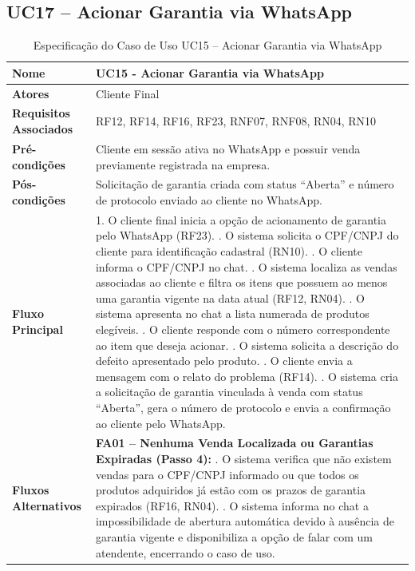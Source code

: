 \subsection{UC17 – Acionar Garantia via WhatsApp}

\begin{table}[H]
	\centering
	\caption{Especificação do Caso de Uso UC15 – Acionar Garantia via WhatsApp}
	\label{tab:uc15}
	\begin{tabular}{|p{3.5cm}|p{11.5cm}|}
		\hline
		\textbf{Nome} & UC15 - Acionar Garantia via WhatsApp \\ \hline
		\textbf{Atores} & Cliente Final \\ \hline
		\textbf{Requisitos Associados} & RF12, RF14, RF16, RF23, RNF07, RNF08, RN04, RN10 \\ \hline
		\textbf{Pré-condições} & Cliente em sessão ativa no WhatsApp e possuir venda previamente registrada na empresa. \\ \hline
		\textbf{Pós-condições} & Solicitação de garantia criada com status ``Aberta'' e número de protocolo enviado ao cliente no WhatsApp. \\ \hline
		\textbf{Fluxo Principal} & 
		1. O cliente final inicia a opção de acionamento de garantia pelo WhatsApp (RF23). \newline
		2. O sistema solicita o CPF/CNPJ do cliente para identificação cadastral (RN10). \newline
		3. O cliente informa o CPF/CNPJ no chat. \newline
		4. O sistema localiza as vendas associadas ao cliente e filtra os itens que possuem ao menos uma garantia vigente na data atual (RF12, RN04). \newline
		5. O sistema apresenta no chat a lista numerada de produtos elegíveis. \newline
		6. O cliente responde com o número correspondente ao item que deseja acionar. \newline
		7. O sistema solicita a descrição do defeito apresentado pelo produto. \newline
		8. O cliente envia a mensagem com o relato do problema (RF14). \newline
		9. O sistema cria a solicitação de garantia vinculada à venda com status ``Aberta'', gera o número de protocolo e envia a confirmação ao cliente pelo WhatsApp. \\ \hline
		\textbf{Fluxos Alternativos} & 
		\textbf{FA01 – Nenhuma Venda Localizada ou Garantias Expiradas (Passo 4):} \newline
		1. O sistema verifica que não existem vendas para o CPF/CNPJ informado ou que todos os produtos adquiridos já estão com os prazos de garantia expirados (RF16, RN04). \newline
		2. O sistema informa no chat a impossibilidade de abertura automática devido à ausência de garantia vigente e disponibiliza a opção de falar com um atendente, encerrando o caso de uso. \\ \hline
	\end{tabular}
\end{table}

